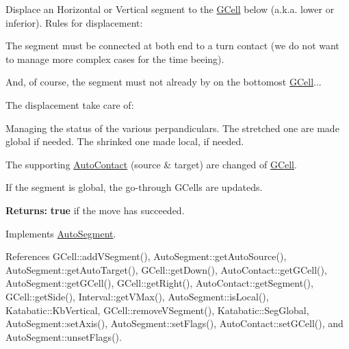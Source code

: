 Displace an Horizontal or Vertical segment to the \hyperlink{classKatabatic_1_1GCell}{G\+Cell} below (a.\+k.\+a. lower or inferior). Rules for displacement\+:
\begin{DoxyItemize}
\item The segment must be connected at both end to a turn contact (we do not want to manage more complex cases for the time beeing).
\item And, of course, the segment must not already by on the bottomost \hyperlink{classKatabatic_1_1GCell}{G\+Cell}...
\end{DoxyItemize}

The displacement take care of\+:
\begin{DoxyItemize}
\item Managing the status of the various perpandiculars. The stretched one are made global if needed. The shrinked one made local, if needed.
\item The supporting \hyperlink{classKatabatic_1_1AutoContact}{Auto\+Contact} (source \& target) are changed of \hyperlink{classKatabatic_1_1GCell}{G\+Cell}.
\item If the segment is global, the go-\/through G\+Cells are updateds.
\end{DoxyItemize}

{\bfseries Returns\+:} {\bfseries true} if the move has succeeded.

 

Implements \hyperlink{classKatabatic_1_1AutoSegment_af8ca7b17e952f4b599aeeb2f4e5be395}{Auto\+Segment}.



References G\+Cell\+::add\+V\+Segment(), Auto\+Segment\+::get\+Auto\+Source(), Auto\+Segment\+::get\+Auto\+Target(), G\+Cell\+::get\+Down(), Auto\+Contact\+::get\+G\+Cell(), Auto\+Segment\+::get\+G\+Cell(), G\+Cell\+::get\+Right(), Auto\+Contact\+::get\+Segment(), G\+Cell\+::get\+Side(), Interval\+::get\+V\+Max(), Auto\+Segment\+::is\+Local(), Katabatic\+::\+Kb\+Vertical, G\+Cell\+::remove\+V\+Segment(), Katabatic\+::\+Seg\+Global, Auto\+Segment\+::set\+Axis(), Auto\+Segment\+::set\+Flags(), Auto\+Contact\+::set\+G\+Cell(), and Auto\+Segment\+::unset\+Flags().

\mbox{\label{classKatabatic_1_1AutoHorizontal_aa469e37853e31f8b1bc817518c896d62}} 
